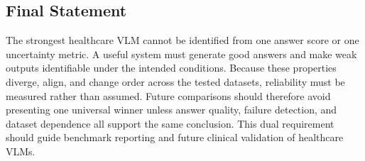 \subsection{Final Statement}

The strongest healthcare VLM cannot be identified from one answer score or one uncertainty metric. A useful system must generate good answers and make weak outputs identifiable under the intended conditions. Because these properties diverge, align, and change order across the tested datasets, reliability must be measured rather than assumed. Future comparisons should therefore avoid presenting one universal winner unless answer quality, failure detection, and dataset dependence all support the same conclusion. This dual requirement should guide benchmark reporting and future clinical validation of healthcare VLMs.
